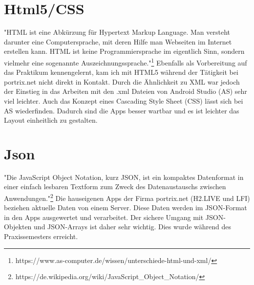 \section{Html5/CSS}
"HTML ist eine Abk\"urzung f\"ur Hypertext Markup Language. Man versteht darunter eine Computersprache, mit deren Hilfe man Webseiten im Internet erstellen kann. HTML ist keine Programmiersprache im eigentlich Sinn, sondern vielmehr eine sogenannte Auszeichnungssprache."\footnote{https://www.as-computer.de/wissen/unterschiede-html-und-xml/} Ebenfalls als Vorbereitung auf das Praktikum kennengelernt, kam ich mit HTML5 w\"ahrend der T\"atigkeit bei portrix.net nicht direkt in Kontakt. Durch die \"Ahnlichkeit zu XML war jedoch der Einstieg in das Arbeiten mit den .xml Dateien von Android Studio (AS) sehr viel leichter. Auch das Konzept eines Cascading Style Sheet (CSS) l\"asst sich bei AS wiederfinden. Dadurch sind die Apps besser wartbar und es ist leichter das Layout einheitlich zu gestalten.

\section{Json}
"Die JavaScript Object Notation, kurz JSON, ist ein kompaktes Datenformat in einer einfach lesbaren Textform zum Zweck des Datenaustauschs zwischen Anwendungen."\footnote{https://de.wikipedia.org/wiki/JavaScript\_Object\_Notation/} Die hauseigenen Apps der Firma portrix.net (H2.LIVE und LFI) beziehen aktuelle Daten von einem Server. Diese Daten werden im JSON-Format in den Apps ausgewertet und verarbeitet. Der sichere Umgang mit JSON-Objekten und JSON-Arrays ist daher sehr wichtig. Dies wurde w\"ahrend des Praxissemesters erreicht.

